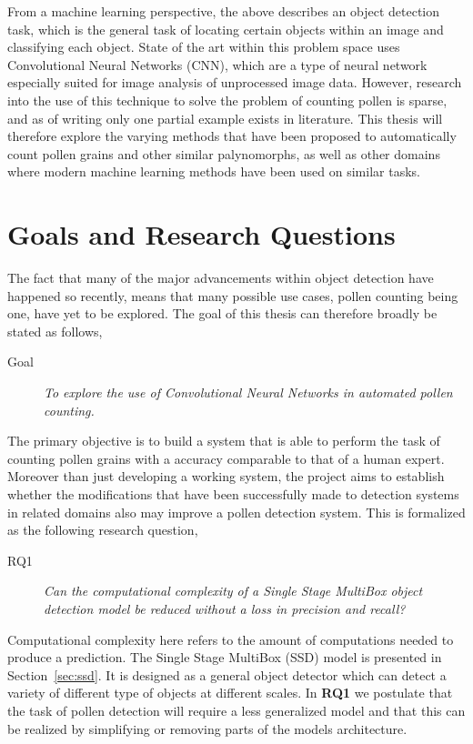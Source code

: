 From a machine learning perspective, the above describes an object detection task, which is the general task of locating certain objects within an image and classifying each object.
State of the art within this problem space uses Convolutional Neural Networks (CNN), which are a type of neural network especially suited for image analysis of unprocessed image data.
However, research into the use of this technique to solve the problem of counting pollen is sparse, and as of writing only one partial example exists in literature.
This thesis will therefore explore the varying methods that have been proposed to automatically count pollen grains and other similar palynomorphs, as well as other domains where modern machine learning methods have been used on similar tasks.

\section{Goals and Research Questions}\label{sec:Goals and Research Questions}
The fact that many of the major advancements within object detection have happened so recently, means that many possible use cases, pollen counting being one, have yet to be explored.
The goal of this thesis can therefore broadly be stated as follows,

\begin{description}
\item[Goal] \textit{To explore the use of Convolutional Neural Networks in automated pollen counting.}
\end{description}

The primary objective is to build a system that is able to perform the task of counting pollen grains with a accuracy comparable to that of a human expert.
Moreover than just developing a working system, the project aims to establish whether the modifications that have been successfully made to detection systems in related domains also may improve a pollen detection system.
This is formalized as the following research question, 

\begin{description}
\item[RQ1] \textit{Can the computational complexity of a Single Stage MultiBox object detection model be reduced without a loss in precision and recall?}
\end{description}

Computational complexity here refers to the amount of computations needed to produce a prediction.
The Single Stage MultiBox (SSD) model is presented in Section~\ref{sec:ssd}.
It is designed as a general object detector which can detect a variety of different type of objects at different scales.
In \textbf{RQ1} we postulate that the task of pollen detection will require a less generalized model and that this can be realized by simplifying or removing parts of the models architecture.
 
